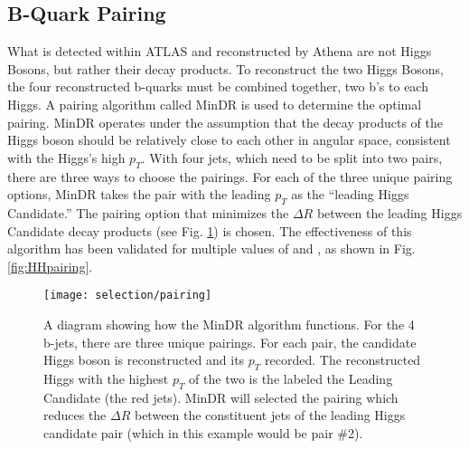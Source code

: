     \subsection{B-Quark Pairing}

        What is detected within ATLAS and reconstructed by Athena are not Higgs Bosons, but rather their decay products.
        To reconstruct the two Higgs Bosons, the four reconstructed b-quarks must be combined together, two b's to each Higgs.
        A pairing algorithm called MinDR\cite{hh4b_2021_int_note}
            is used to determine the optimal pairing.
        MinDR operates under the assumption that the decay products of the Higgs boson
            should be relatively close to each other in angular space, consistent with the Higgs's high $p_T$.
        With four jets, which need to be split into two pairs, there are three ways to choose the pairings.
        For each of the three unique pairing options, MinDR takes the pair with the leading $p_T$ as the ``leading Higgs Candidate.''
        The pairing option that minimizes the $\Delta R$ between the leading Higgs Candidate decay products
            (see Fig. \ref{fig:minDR_pairing_diagram}) is chosen.
        The effectiveness of this algorithm has been validated for multiple values of \kvv and \kl,
            as shown in Fig. \ref{fig:HHpairing}.

        \begin{figure}[tbh]
            \texttt{[image: selection/pairing]}
            \caption{
                A diagram showing how the MinDR algorithm functions.
                For the 4 b-jets, there are three unique pairings.
                For each pair, the candidate Higgs boson is reconstructed and its $p_T$ recorded.
                The reconstructed Higgs with the highest $p_T$ of the two is the labeled the Leading Candidate
                    (the red jets).
                MinDR will selected the pairing which reduces the $\Delta R$ between the constituent jets
                    of the leading Higgs candidate pair (which in this example would be pair \#2)\cite{hh4b_2021_int_note}.
            }
            \label{fig:minDR_pairing_diagram}
        \end{figure}

